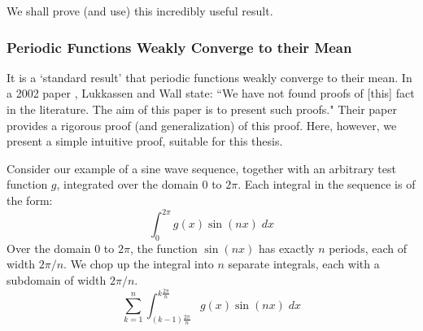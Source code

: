 \documentclass[a4paper]{report}
\begin{document}
We shall prove (and use) this incredibly useful result.

\subsubsection*{Periodic Functions Weakly Converge to their Mean}

It is a `standard result' that periodic functions weakly converge to their mean.  In a 2002 paper \cite{Lukkassen2002}, Lukkassen and Wall state: ``We have not found proofs of [this] fact in the literature.  The aim of this paper is to present such proofs."  Their paper provides a rigorous proof (and generalization) of this proof.  Here, however, we present a simple intuitive proof, suitable for this thesis.

\vspace{1em}

Consider our example of a sine wave sequence, together with an arbitrary test function $g$, integrated over the domain $0$ to $2 \pi$.
Each integral in the sequence is of the form:
\begin{equation}
\int_0^{2\pi} g(x) \sin(nx) \;dx
\end{equation}
Over the domain $0$ to $2\pi$, the function $\sin(nx)$ has exactly $n$ periods, each of width $2\pi /n$.
We chop up the integral into $n$ separate integrals, each with a subdomain of width $2\pi/n$.
\begin{equation}
\sum_{k=1}^n  \int_{(k-1) \frac{2\pi}{n}}^{k \frac{2\pi}{n}} g(x) \sin(nx) \;dx
\end{equation}

\begin{center}
\end{center}
\end{document}

